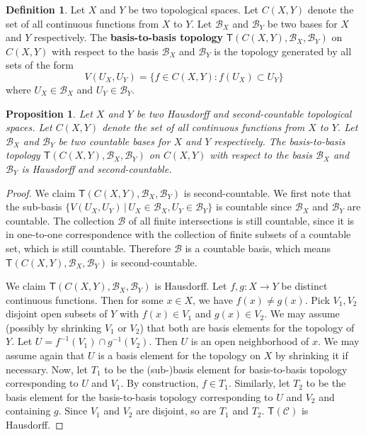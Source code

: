\documentclass[review]{elsarticle}
\theoremstyle{plain}%
\newtheorem{prop}[thm]{Proposition}
\theoremstyle{definition}
\newtheorem{defn}{Definition}[section]
\theoremstyle{remark}
\begin{document}
\begin{defn} Let $X$ and $Y$ be two topological spaces. Let $C(X,Y)$ denote the set of all continuous functions from $X$ to $Y$. Let $\mathcal{B}_X$ and $\mathcal{B}_Y$ be two bases for $X$ and $Y$ respectively. The \textbf{basis-to-basis topology} $\mathsf{T}(C(X,Y), \mathcal{B}_X, \mathcal{B}_Y)$ on $C(X,Y)$ with respect to the basis $\mathcal{B}_X$ and $\mathcal{B}_Y$ is the topology generated by all sets of the form 
	$$
	V(U_X, U_Y) = \{f\in C(X,Y) : f(U_X)\subset U_Y\}
	$$
where $U_X \in \mathcal{B}_X$ and $U_Y \in \mathcal{B}_Y$.
\end{defn}

\begin{prop}
	Let $X$ and $Y$ be two Hausdorff and second-countable topological spaces. Let $C(X,Y)$ denote the set of all continuous functions from $X$ to $Y$. Let $\mathcal{B}_X$ and $\mathcal{B}_Y$ be two countable bases for $X$ and $Y$ respectively. The basis-to-basis topology $\mathsf{T}(C(X,Y), \mathcal{B}_X, \mathcal{B}_Y)$ on $C(X,Y)$ with respect to the basis $\mathcal{B}_X$ and $\mathcal{B}_Y$ is Hausdorff and second-countable. 
\end{prop}
\begin{proof}
	We claim $\mathsf{T}(C(X,Y), \mathcal{B}_X, \mathcal{B}_Y)$ is second-countable. We first note that the sub-basis $\{V(U_X, U_Y) \, |\,   U_X \in \mathcal{B}_X , U_Y \in \mathcal{B}_Y \}$ is countable since $\mathcal{B}_X$ and $\mathcal{B}_Y$ are countable. The collection $\mathcal{B}$ of all finite intersections is still countable, since it is in one-to-one correspondence with the collection of finite subsets of a countable set, which is still countable. Therefore $\mathcal{B}$ is a countable basis, which means $\mathsf{T}(C(X,Y), \mathcal{B}_X, \mathcal{B}_Y)$ is second-countable.
	
	We claim $\mathsf{T}(C(X,Y), \mathcal{B}_X, \mathcal{B}_Y)$ is Hausdorff. Let $f,g:X\to Y$ be distinct continuous functions. Then for some $x\in X$, we have $f(x)\neq g(x)$. Pick $V_1, V_2$ disjoint open subsets of $Y$ with $f(x)\in V_1$ and $g(x)\in V_2$. We may assume (possibly by shrinking $V_1$ or $V_2$) that both are basis elements for the topology of $Y$. Let $U=f^{-1}(V_1)\cap g^{-1}(V_2)$. Then $U$ is an open neighborhood of $x$. We may assume again that $U$ is a basis element for the topology on $X$ by shrinking it if necessary. Now, let $T_1$ to be the (sub-)basis element for basis-to-basis topology corresponding to $U$ and $V_1$. By construction, $f\in T_1$. Similarly, let $T_2$ to be the basis element for the basis-to-basis topology corresponding to $U$ and $V_2$ and containing $g$. Since $V_1$ and $V_2$ are disjoint, so are $T_1$ and $T_2$. $\mathsf{T}(\mathcal{C})$ is Hausdorff.
\end{proof}
\end{document}
